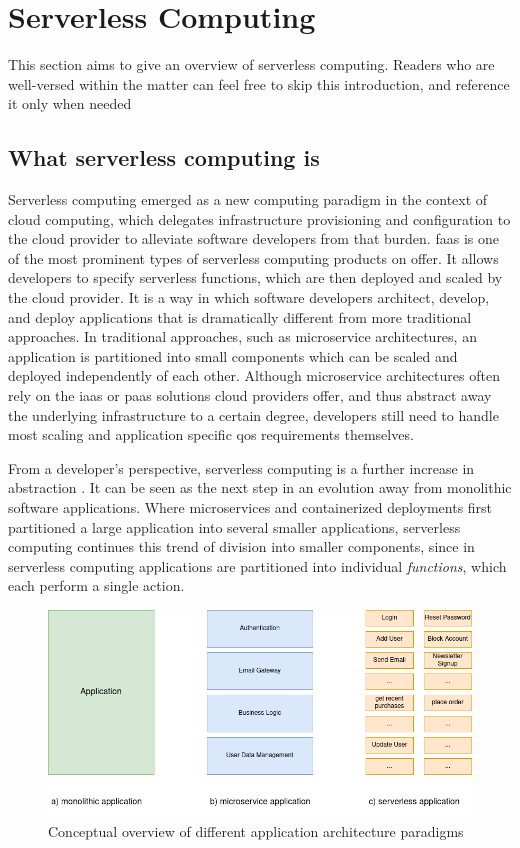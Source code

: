 \section{Serverless Computing}
This section aims to give an overview of serverless computing.
Readers who are well-versed within the matter can feel free to skip this introduction, and reference it only when needed
\subsection{What serverless computing is}
Serverless computing emerged as a new computing paradigm in the context of cloud computing, which delegates infrastructure provisioning and configuration to the cloud provider to alleviate software developers from that burden.
\gls{faas} is one of the most prominent types of serverless computing products on offer.
It allows developers to specify serverless functions, which are then deployed and scaled by the cloud provider.
It is a way in which software developers architect, develop, and deploy applications that is dramatically different from more traditional approaches.
In traditional approaches, such as microservice architectures, an application is partitioned into small components which can be scaled and deployed independently of each other.
Although microservice architectures often rely on the \gls{iaas} or \gls{paas} solutions cloud providers offer, and thus abstract away the underlying infrastructure to a certain degree, developers still need to handle most scaling and application specific \gls{qos} requirements themselves.

From a developer's perspective, serverless computing is a further increase in abstraction \cite{jonasCloudProgrammingSimplified2019}.
It can be seen as the next step in an evolution away from monolithic software applications.
Where microservices and containerized deployments first partitioned a large application into several smaller applications, serverless computing continues this trend of division into smaller components, since in serverless computing applications are partitioned into individual \textit{functions}, which each perform a single action\cite{khandelwalTaureauDeconstructingServerless2020}.

\begin{figure}
    \centering
    \includegraphics[width=\columnwidth]{graphics/diagrams/monolith_micro_serverless.png}
    \caption{Conceptual overview of different application architecture paradigms}
    \label{fig:mono_micro_serverless}
\end{figure}

